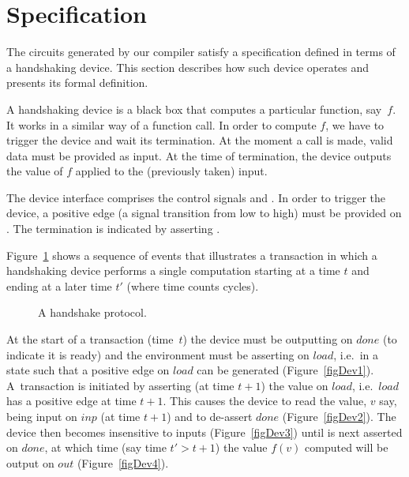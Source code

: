 \documentclass{llncs}
\begin{document}
\section{Specification}
\label{secSpecification}
The circuits generated by our compiler satisfy
a specification defined in terms of a handshaking device.
This section describes how such device operates and 
presents its formal definition.

A handshaking device is a black box that 
computes a particular function, say~$f$. 
It works in a similar way of a function call.
In order to compute $f$, we have to trigger 
the device and wait its termination.
At the moment a call is made, valid data
must be provided as input. At the time of
termination, the device outputs the value
of $f$ applied to the (previously taken) input.

The device interface comprises
the control signals  and .
In order to trigger the device, a positive
edge (a signal transition from low to high)
must be provided on . The termination
is indicated by asserting .

Figure~\ref{figDev} shows a sequence of events that illustrates a
transaction in which a handshaking device performs a single
computation starting at a time $t$ and ending at a later time $t'$
(where time counts cycles). 

\begin{figure}[htb]
   \centerline{
      }
   \hspace*{0.4cm}
   \centerline{
      \hspace*{0cm}}
      \caption{\label{figDev}A handshake protocol.}
\end{figure}
At the start of a transaction (time~$t$) the device must be outputting  on $done$
(to indicate it is ready) and the environment must be asserting
 on $load$, i.e.~in a state such that a positive edge on $load$
can be generated (Figure~\ref{figDev1}). 
A~transaction is initiated by asserting (at time
$t{+}1$) the value  on $load$, i.e.~$load$ has a positive edge
at time $t{+}1$. This causes the device to read the value, $v$
say, being input on $inp$ (at time $t{+}1$) and to de-assert $done$
(Figure~\ref{figDev2}).
The device then becomes insensitive to inputs (Figure~\ref{figDev3})
until  is next asserted on $done$,
at which time (say time $t' > t{+}1$) the value
$f(v)$ computed will be output on $out$ (Figure~\ref{figDev4}).
\end{document}
